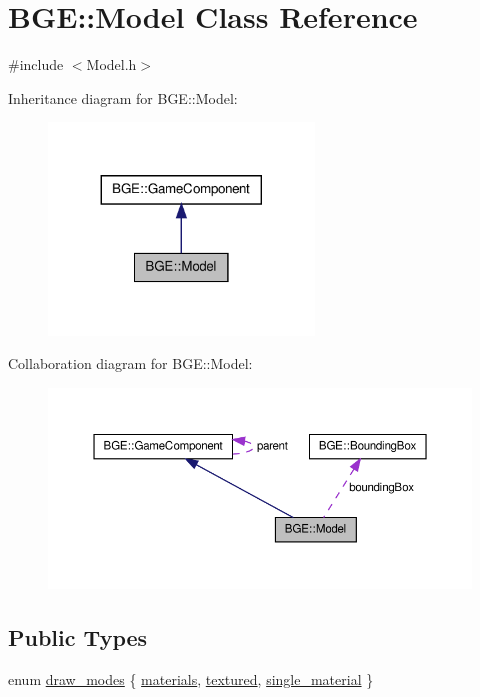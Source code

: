 \hypertarget{class_b_g_e_1_1_model}{\section{B\-G\-E\-:\-:Model Class Reference}
\label{class_b_g_e_1_1_model}
}


{\ttfamily \#include $<$Model.\-h$>$}



Inheritance diagram for B\-G\-E\-:\-:Model\-:
\nopagebreak
\begin{figure}[H]
\begin{center}
\leavevmode
\includegraphics[width=200pt]{class_b_g_e_1_1_model__inherit__graph}
\end{center}
\end{figure}


Collaboration diagram for B\-G\-E\-:\-:Model\-:
\nopagebreak
\begin{figure}[H]
\begin{center}
\leavevmode
\includegraphics[width=350pt]{class_b_g_e_1_1_model__coll__graph}
\end{center}
\end{figure}
\subsection*{Public Types}
\begin{DoxyCompactItemize}
\item 
enum \hyperlink{class_b_g_e_1_1_model_a0d55ea97da6ffbc3b82c2c1566d13a5e}{draw\-\_\-modes} \{ \hyperlink{class_b_g_e_1_1_model_a0d55ea97da6ffbc3b82c2c1566d13a5ea76d2d1812f4c53ef4fac0df0f10e620a}{materials}, 
\hyperlink{class_b_g_e_1_1_model_a0d55ea97da6ffbc3b82c2c1566d13a5ea109596b0ad8209d41db5daffc24b96e5}{textured}, 
\hyperlink{class_b_g_e_1_1_model_a0d55ea97da6ffbc3b82c2c1566d13a5ea2bf58f97a3875b3b5621b6e7ca968ba5}{single\-\_\-material}
 \}
\end{DoxyCompactItemize}
